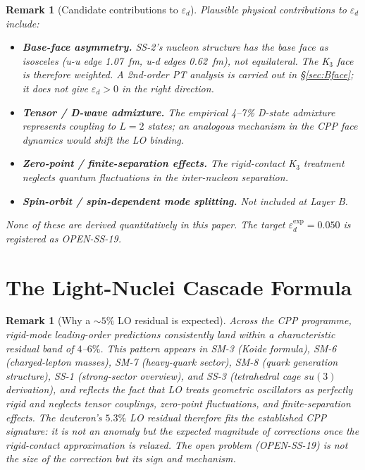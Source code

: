 \documentclass[11pt,letterpaper]{article}
\newtheorem{remark}[theorem]{Remark}
\newcommand{\epsd}{\varepsilon_{d}}
\begin{document}
\begin{remark}[Candidate contributions to $\epsd$]
\label{rem:epsd_candidates}
Plausible physical contributions to $\epsd$ include:
\begin{itemize}
\item \textbf{Base-face asymmetry.} SS-2's nucleon structure has the base face as isosceles (u-u edge 1.07~fm, u-d edges 0.62~fm), not equilateral. The K$_3$ face is therefore weighted. A 2nd-order PT analysis is carried out in §\ref{sec:Bface}; it does not give $\epsd > 0$ in the right direction.
\item \textbf{Tensor / D-wave admixture.} The empirical 4--7\% D-state admixture represents coupling to $L=2$ states; an analogous mechanism in the CPP face dynamics would shift the LO binding.
\item \textbf{Zero-point / finite-separation effects.} The rigid-contact K$_3$ treatment neglects quantum fluctuations in the inter-nucleon separation.
\item \textbf{Spin-orbit / spin-dependent mode splitting.} Not included at Layer B.
\end{itemize}
None of these are derived quantitatively in this paper. The target $\epsd^{\mathrm{exp}} = 0.050$ is registered as OPEN-SS-19.
\end{remark}

\section{The Light-Nuclei Cascade Formula}
\label{sec:cascade}

\begin{remark}[Why a $\sim 5\%$ LO residual is expected]
Across the CPP programme, rigid-mode leading-order predictions consistently land within a characteristic residual band of $4$--$6\%$. This pattern appears in SM-3 (Koide formula), SM-6 (charged-lepton masses), SM-7 (heavy-quark sector), SM-8 (quark generation structure), SS-1 (strong-sector overview), and SS-3 (tetrahedral cage $su(3)$ derivation), and reflects the fact that LO treats geometric oscillators as perfectly rigid and neglects tensor couplings, zero-point fluctuations, and finite-separation effects. The deuteron's $5.3\%$ LO residual therefore fits the established CPP signature: it is not an anomaly but the expected magnitude of corrections once the rigid-contact approximation is relaxed. The open problem (OPEN-SS-19) is not the size of the correction but its \emph{sign} and \emph{mechanism}.
\end{remark}
\end{document}
